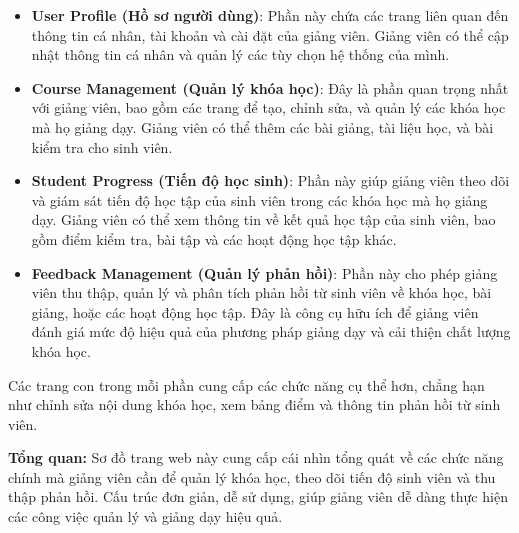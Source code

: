 \begin{itemize}
    \item \textbf{User Profile (Hồ sơ người dùng)}: Phần này chứa các trang liên quan đến thông tin cá nhân, tài khoản và cài đặt của giảng viên. Giảng viên có thể cập nhật thông tin cá nhân và quản lý các tùy chọn hệ thống của mình.
    \item \textbf{Course Management (Quản lý khóa học)}: Đây là phần quan trọng nhất với giảng viên, bao gồm các trang để tạo, chỉnh sửa, và quản lý các khóa học mà họ giảng dạy. Giảng viên có thể thêm các bài giảng, tài liệu học, và bài kiểm tra cho sinh viên.
    \item \textbf{Student Progress (Tiến độ học sinh)}: Phần này giúp giảng viên theo dõi và giám sát tiến độ học tập của sinh viên trong các khóa học mà họ giảng dạy. Giảng viên có thể xem thông tin về kết quả học tập của sinh viên, bao gồm điểm kiểm tra, bài tập và các hoạt động học tập khác.
    \item \textbf{Feedback Management (Quản lý phản hồi)}: Phần này cho phép giảng viên thu thập, quản lý và phân tích phản hồi từ sinh viên về khóa học, bài giảng, hoặc các hoạt động học tập. Đây là công cụ hữu ích để giảng viên đánh giá mức độ hiệu quả của phương pháp giảng dạy và cải thiện chất lượng khóa học.
\end{itemize}

\par Các trang con trong mỗi phần cung cấp các chức năng cụ thể hơn, chẳng hạn như chỉnh sửa nội dung khóa học, xem bảng điểm và thông tin phản hồi từ sinh viên.

\par \textbf{Tổng quan:} Sơ đồ trang web này cung cấp cái nhìn tổng quát về các chức năng chính mà giảng viên cần để quản lý khóa học, theo dõi tiến độ sinh viên và thu thập phản hồi. Cấu trúc đơn giản, dễ sử dụng, giúp giảng viên dễ dàng thực hiện các công việc quản lý và giảng dạy hiệu quả.
